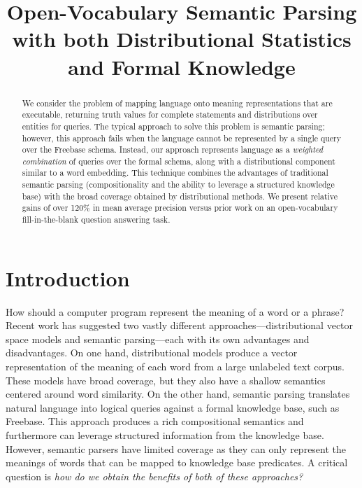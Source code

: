 \documentclass[11pt]{article}
\title{Open-Vocabulary Semantic Parsing\\with both Distributional
Statistics and Formal Knowledge}
\author{}%
\date{}
\begin{document}
\maketitle

\begin{abstract}

  We consider the problem of mapping language onto meaning
  representations that are executable, returning truth values for
  complete statements and distributions over entities for queries.
  The typical approach to solve this problem is semantic parsing;
  however, this approach fails when the language cannot be represented
  by a single query over the Freebase schema.  Instead, our approach
  represents language as a \emph{weighted combination} of queries over
  the formal schema, along with a distributional component similar to
  a word embedding.  This technique combines the advantages of
  traditional semantic parsing (compositionality and the ability to
  leverage a structured knowledge base) with the broad coverage
  obtained by distributional methods.  We present relative gains of
  over 120\% in mean average precision versus prior work on an
  open-vocabulary fill-in-the-blank question answering task.

\end{abstract}

\section{Introduction}

How should a computer program represent the meaning of a word or a
phrase? Recent work has suggested two vastly different
approaches---distributional vector space models and semantic
parsing---each with its own advantages and disadvantages. On one hand,
distributional models produce a vector representation of the meaning
of each word from a large unlabeled text corpus. These models have
broad coverage, but they also have a shallow semantics centered around
word similarity. On the other hand, semantic parsing translates
natural language into logical queries against a formal knowledge base,
such as Freebase. This approach produces a rich compositional
semantics and furthermore can leverage structured information from the
knowledge base. However, semantic parsers have limited coverage as
they can only represent the meanings of words that can be mapped to
knowledge base predicates. A critical question is \emph{how do we
obtain the benefits of both of these approaches?}
\end{document}
